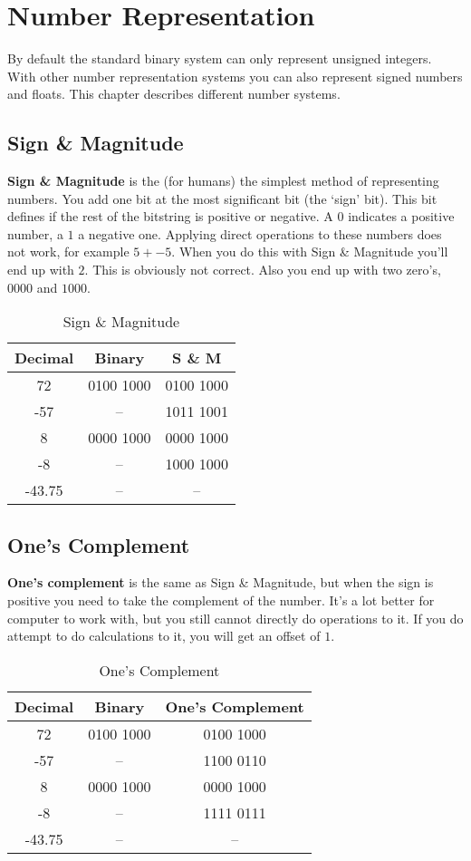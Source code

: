\section{Number Representation}

By default the standard binary system can only represent unsigned integers.
With other number representation systems you can also represent signed numbers and floats.
This chapter describes different number systems.

\subsection{Sign \& Magnitude}
{\bf Sign \& Magnitude} is the (for humans) the simplest method of representing numbers.
You add one bit at the most significant bit (the `sign' bit).
This bit defines if the rest of the bitstring is positive or negative.
A \(0\) indicates a positive number, a \(1\) a negative one.
Applying direct operations to these numbers does not work, for example \(5 + -5\).
When you do this with Sign \& Magnitude you'll end up with \(2\).
This is obviously not correct.
Also you end up with two zero's, \(0000\) and \(1000\).

\begin{table}[h]
	\centering
	\begin{tabular}{c | c | c}
		Decimal & Binary    & S \& M    \\
		\hline
		72      & 0100 1000 & 0100 1000 \\
		-57     & --        & 1011 1001 \\
		8       & 0000 1000 & 0000 1000 \\
		-8      & --        & 1000 1000 \\
		-43.75  & --        & --        \\
	\end{tabular}
	\caption{Sign \& Magnitude}
\end{table}

\subsection{One's Complement}
{\bf One's complement} is the same as Sign \& Magnitude,
but when the sign is positive you need to take the complement of the number.
It's a lot better for computer to work with, but you still cannot directly do operations to it.
If you do attempt to do calculations to it, you will get an offset of \(1\).

\begin{table}[h]
	\centering
	\begin{tabular}{c | c | c}
		Decimal & Binary    & One's Complement \\
		\hline
		72      & 0100 1000 & 0100 1000        \\
		-57     & --        & 1100 0110        \\
		8       & 0000 1000 & 0000 1000        \\
		-8      & --        & 1111 0111        \\
		-43.75  & --        & --               \\
	\end{tabular}
	\caption{One's Complement}
\end{table}

